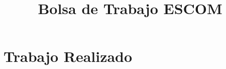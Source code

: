 \documentclass[11pt, twopages]{book}
\date{}
\title{Bolsa de Trabajo ESCOM}
\author{}
\begin{document}
    \frontmatter
        \maketitle
        \tableofcontents
        \listoffigures
        \listoftables
    \mainmatter
    


    

    
    \chapter{Trabajo Realizado}
    \label{sprints}
    
    
        
    \appendix

        
        
        

    \medskip

    \printbibliography
        \printbibliography
\end{document}
